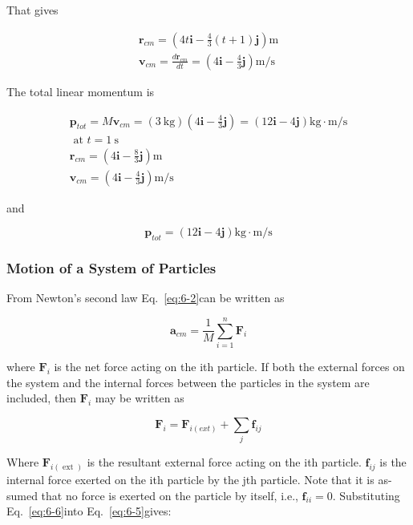 \documentclass[10pt]{article}
\numberwithin{equation}{section}
\begin{document}
That gives

$$
\begin{gathered}
\mathbf{r}_{c m}=\left(4 t \mathbf{i}-\frac{4}{3}(t+1) \mathbf{j}\right) \mathrm{m} \\
\mathbf{v}_{c m}=\frac{d \mathbf{r}_{c m}}{d t}=\left(4 \mathbf{i}-\frac{4}{3} \mathbf{j}\right) \mathrm{m} / \mathrm{s}
\end{gathered}
$$

The total linear momentum is

$$
\begin{gathered}
\mathbf{p}_{t o t}=M \mathbf{v}_{c m}=(3 \mathrm{~kg})\left(4 \mathbf{i}-\frac{4}{3} \mathbf{j}\right)=(12 \mathbf{i}-4 \mathbf{j}) \mathrm{kg} \cdot \mathrm{m} / \mathrm{s} \\
\text { at } t=1 \mathrm{~s} \\
\mathbf{r}_{c m}=\left(4 \mathbf{i}-\frac{8}{3} \mathbf{j}\right) \mathrm{m} \\
\mathbf{v}_{c m}=\left(4 \mathbf{i}-\frac{4}{3} \mathbf{j}\right) \mathrm{m} / \mathrm{s}
\end{gathered}
$$

and

$$
\mathbf{p}_{t o t}=(12 \mathbf{i}-4 \mathbf{j}) \mathrm{kg} \cdot \mathrm{m} / \mathrm{s}
$$

\subsubsection{Motion of a System of Particles}\label{sec:6-3-7}
From Newton's second law Eq.~\eqref{eq:6-2}can be written as


\begin{equation}
\mathbf{a}_{c m}=\frac{1}{M} \sum_{i=1}^{n} \mathbf{F}_{i} \label{eq:6-5}
\end{equation}


where $\mathbf{F}_{i}$ is the net force acting on the ith particle. If both the external forces on the system and the internal forces between the particles in the system are included, then $\mathbf{F}_{i}$ may be written as


\begin{equation}
\mathbf{F}_{i}=\mathbf{F}_{i(e x t)}+\sum_{j} \mathbf{f}_{i j} \label{eq:6-6}
\end{equation}


Where $\mathbf{F}_{i(\text { ext })}$ is the resultant external force acting on the ith particle. $\mathbf{f}_{i j}$ is the internal force exerted on the ith particle by the jth particle. Note that it is as- sumed that no force is exerted on the particle by itself, i.e., $\mathbf{f}_{i i}=0$. Substituting Eq.~\eqref{eq:6-6}into Eq.~\eqref{eq:6-5}gives:
\end{document}
